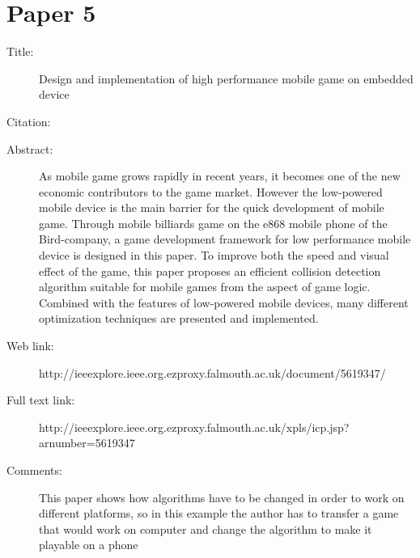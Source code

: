 \documentclass{scrartcl}
\begin{document}
\section*{Paper 5}
\begin{description}
\item[Title:] Design and implementation of high performance mobile game on embedded device
\item[Citation:] \cite{yang2010design}
\item[Abstract:] As mobile game grows rapidly in recent years, it becomes one of the new economic contributors to the game market. However the low-powered mobile device is the main barrier for the quick development of mobile game. Through mobile billiards game on the e868 mobile phone of the Bird-company, a game development framework for low performance mobile device is designed in this paper. To improve both the speed and visual effect of the game, this paper proposes an efficient collision detection algorithm suitable for mobile games from the aspect of game logic. Combined with the features of low-powered mobile devices, many different optimization techniques are presented and implemented.
\item[Web link:] http://ieeexplore.ieee.org.ezproxy.falmouth.ac.uk/document/5619347/
\item[Full text link:] http://ieeexplore.ieee.org.ezproxy.falmouth.ac.uk/xpls/icp.jsp?arnumber=5619347
\item[Comments:] This paper shows how algorithms have to be changed in order to work on different platforms, so in this example the author has to transfer a game that would work on computer and change the algorithm to make it playable on a phone
\end{description}



\end{document}
